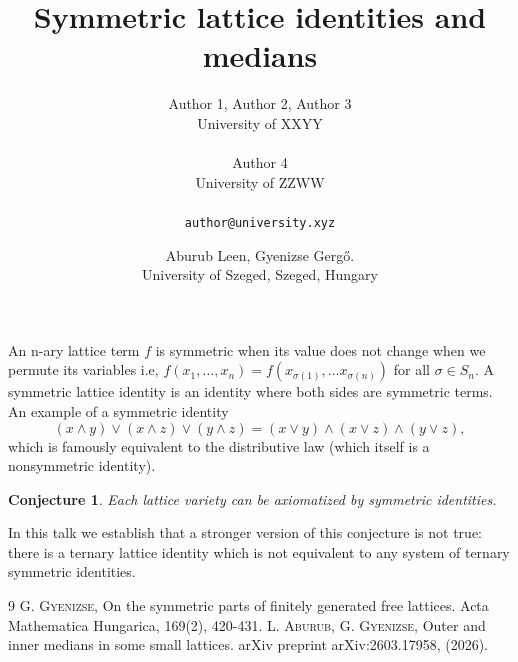 \documentclass[a4paper]{article} %
\date{} %
\newtheorem{conjecture}[theorem]{Conjecture}
\begin{document}
\setcounter{page}{1} %

\title{Symmetric lattice identities and medians}

\author{Author 1, Author 2, Author 3 \\ %
       University of XXYY\\ \\ %
       Author 4 \\ %
       University of ZZWW\\ \\ %
       \texttt{author@university.xyz} %
       }%

\author{Aburub Leen, Gyenizse Gerg\H o.\\
University of Szeged, Szeged, Hungary}

\maketitle


 An n-ary lattice term $f$ is symmetric when its value does not change when we permute its variables i.e, $f(x_1,  \dots, x_n)=f(x_{\sigma(1)},\dots x_{\sigma(n)})$ for all $\sigma \in S_n$. A symmetric lattice identity is an identity where both sides are symmetric terms. An example of a symmetric identity 
 \[
 (x \wedge y)\vee (x \wedge z) \vee (y \wedge z) =(x \vee y)\wedge (x \vee z) \wedge (y \vee z),
 \]
which is famously equivalent to the distributive law (which itself is a nonsymmetric identity).
\begin{conjecture}
    Each lattice variety can be axiomatized by symmetric identities.
\end{conjecture}

In this talk we establish that a stronger version of this conjecture is not true: there is a ternary lattice identity which is not equivalent to any system of ternary symmetric identities.
\begin{thebibliography}{9}
\textsc{G. Gyenizse}, On the symmetric parts of finitely generated free lattices. Acta Mathematica Hungarica, 169(2), 420-431.
\textsc{L. Aburub, G. Gyenizse}, Outer and inner medians in some small lattices. arXiv preprint arXiv:2603.17958, (2026).

\end{thebibliography}
\end{document}
